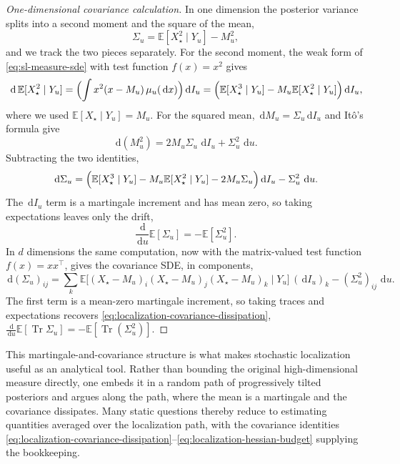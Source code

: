 \documentclass[10pt,a4paper]{amsart}
\numberwithin{equation}{section}
\DeclareMathOperator{\Tr}{Tr}
\newcommand{\E}{\mathbb{E}}
\newcommand{\dd}{\,\mathrm{d}}
\begin{document}
\begin{proof}[One-dimensional covariance calculation]
In one dimension the posterior variance splits into a second moment and the
square of the mean,
\[
    \Sigma_u=\E[X_\star^2\mid Y_u]-M_u^2,
\]
and we track the two pieces separately.  For the second moment, the weak form
of \eqref{eq:sl-measure-sde} with test function $f(x)=x^2$ gives
\[
    \dd\,\E[X_\star^2\mid Y_u]
    =
    \Bigl(\int x^2(x-M_u)\,\mu_u(\dd x)\Bigr)\dd I_u
    =
    \Bigl(\E[X_\star^3\mid Y_u]-M_u\E[X_\star^2\mid Y_u]\Bigr)\dd I_u,
\]
where we used $\E[X_\star\mid Y_u]=M_u$.  For the squared mean,
$\dd M_u=\Sigma_u\dd I_u$ and It\^o's formula give
\[
    \dd(M_u^2)=2M_u\Sigma_u\,\dd I_u+\Sigma_u^2\,\dd u.
\]
Subtracting the two identities,
\[
    \dd\Sigma_u
    =
    \Bigl(\E[X_\star^3\mid Y_u]-M_u\E[X_\star^2\mid Y_u]-2M_u\Sigma_u\Bigr)\dd I_u
    -
    \Sigma_u^2\,\dd u.
\]
The $\dd I_u$ term is a martingale increment and has mean zero, so taking
expectations leaves only the drift,
\[
    \frac{\dd}{\dd u}\E[\Sigma_u]=-\E[\Sigma_u^2].
\]
In $d$ dimensions the same computation, now with the matrix-valued test
function $f(x)=xx^\top$, gives the covariance SDE, in components,
\begin{equation}\label{eq:localization-covariance-sde}
    \dd(\Sigma_u)_{ij}
    =
    \sum_k
    \E\bigl[(X_\star-M_u)_i(X_\star-M_u)_j(X_\star-M_u)_k\mid Y_u\bigr]\,(\dd I_u)_k
    -
    (\Sigma_u^2)_{ij}\,\dd u.
\end{equation}
The first term is a mean-zero martingale increment, so taking traces and
expectations recovers \eqref{eq:localization-covariance-dissipation},
$\frac{\dd}{\dd u}\E[\Tr\Sigma_u]=-\E[\Tr(\Sigma_u^2)]$.
\end{proof}

This martingale-and-covariance structure is what makes stochastic localization
useful as an analytical tool.  Rather than bounding the original
high-dimensional measure directly, one embeds it in a random path of
progressively tilted posteriors and argues along the path, where the mean is a
martingale and the covariance dissipates.  Many static questions thereby reduce
to estimating quantities averaged over the localization path, with the
covariance identities
\eqref{eq:localization-covariance-dissipation}--\eqref{eq:localization-hessian-budget}
supplying the bookkeeping.
\end{document}
